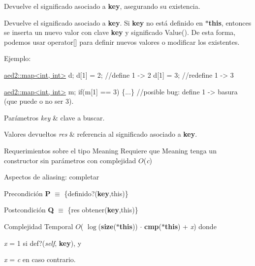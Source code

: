 Devuelve el significado asociado a {\bfseries key}, asegurando su existencia. 

Devuelve el significado asociado a {\bfseries key}. Si {\bfseries key} no está definido en {\bfseries $\ast$this}, entonces se inserta un nuevo valor con clave {\bfseries key} y significado Value(). De esta forma, podemos usar {\ttfamily operator\mbox{[}\mbox{]}} para definir nuevos valores o modificar los existentes.

Ejemplo\+: 
\begin{DoxyCode}
\hyperlink{classaed2_1_1map}{aed2::map<int, int>} d;
d[1] = 2;      \textcolor{comment}{//define 1 -> 2}
d[1] = 3;      \textcolor{comment}{//redefine 1 -> 3}

\hyperlink{classaed2_1_1map}{aed2::map<int, int>} m;
\textcolor{keywordflow}{if}(m[1] == 3) \{...\} \textcolor{comment}{//posible bug: define 1 -> basura (que puede o no ser}
3).
\end{DoxyCode}



\begin{DoxyParams}{Parámetros}
{\em key} & clave a buscar. \\
\hline
\end{DoxyParams}

\begin{DoxyRetVals}{Valores devueltos}
{\em res} & referencia al significado asociado a {\bfseries key}.\\
\hline
\end{DoxyRetVals}
\begin{DoxyParagraph}{Requerimientos sobre el tipo Meaning}
Requiere que Meaning tenga un constructor sin parámetros con complejidad $O$({\itshape c})
\end{DoxyParagraph}
\begin{DoxyParagraph}{Aspectos de aliasing\+:}
completar
\end{DoxyParagraph}
\begin{DoxyPrecond}{Precondición}
{\bfseries P} $\equiv$ \{definido?({\bfseries key},this)\} 
\end{DoxyPrecond}
\begin{DoxyPostcond}{Postcondición}
{\bfseries Q} $\equiv$ \{res  obtener({\bfseries key},this)\}
\end{DoxyPostcond}

\begin{DoxyDescription}
\item[Complejidad Temporal]$O$( $\log$({\bfseries size}({\bfseries $\ast$this})) $\cdot$ {\bfseries cmp}({\bfseries $\ast$this}) + {\itshape x}) donde
\begin{DoxyItemize}
\item {\itshape x} = 1 si def?({\itshape self}, {\bfseries key}), y
\item {\itshape x} = {\itshape c} en caso contrario.
\end{DoxyItemize}
\end{DoxyDescription}

